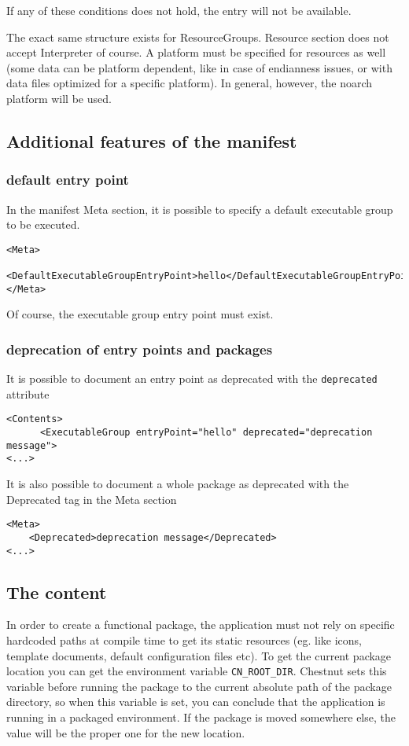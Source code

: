 If any of these conditions does not hold, the entry will not be available.

The exact same structure exists for ResourceGroups. Resource section does not accept Interpreter of course.
A platform must be specified for resources as well (some data can be platform
dependent, like in case of endianness issues, or with data files optimized for
a specific platform). In general, however, the noarch platform will be used.

\subsection{Additional features of the manifest}
\subsubsection{default entry point}

In the manifest Meta section, it is possible to specify a default executable group to be executed.

\begin{verbatim}
<Meta>
      <DefaultExecutableGroupEntryPoint>hello</DefaultExecutableGroupEntryPoint>
</Meta>
\end{verbatim}

Of course, the executable group entry point must exist.

\subsubsection{deprecation of entry points and packages}
It is possible to document an entry point as deprecated with the \verb+deprecated+ attribute
\begin{verbatim}
<Contents>
      <ExecutableGroup entryPoint="hello" deprecated="deprecation message">
<...>
\end{verbatim}

It is also possible to document a whole package as deprecated with the Deprecated tag in the Meta section
\begin{verbatim}
<Meta>
    <Deprecated>deprecation message</Deprecated>
<...>
\end{verbatim}

\subsection{The content}

In order to create a functional package, the application must not rely
on specific hardcoded paths at compile time to get its static
resources (eg. like icons, template documents, default configuration files
etc). To get the current package location you can get the environment variable
\verb+CN_ROOT_DIR+. Chestnut sets this variable before running the package to
the current absolute path of the package directory, so when this variable is
set, you can conclude that the application is running in a packaged
environment. If the package is moved somewhere else, the value will be the
proper one for the new location.

